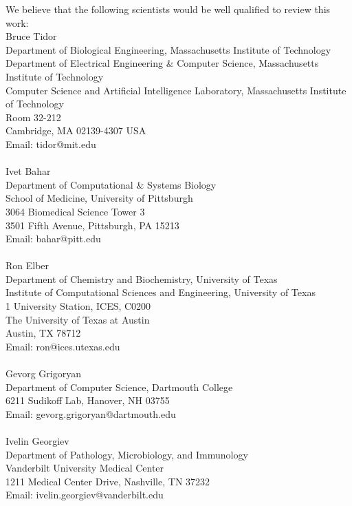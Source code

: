 \documentclass[11pt, oneside]{article}   	%
\begin{document}
\bigskip
We believe that the following scientists would be well qualified to review this work:
\\

\hspace{-0.285in} Bruce Tidor \\Department of Biological Engineering, Massachusetts Institute of Technology \\Department of Electrical Engineering \& Computer Science, Massachusetts Institute of Technology \\Computer Science and Artificial Intelligence Laboratory, Massachusetts Institute of Technology \\Room 32-212 \\Cambridge, MA 02139-4307 USA \\Email: tidor@mit.edu \\
 \\\hspace{-0.285in} Ivet Bahar \\Department of Computational \& Systems Biology \\School of Medicine, University of Pittsburgh \\3064 Biomedical Science Tower 3 \\3501 Fifth Avenue, Pittsburgh, PA 15213 \\Email: bahar@pitt.edu \\
  \\\hspace{-0.285in} Ron Elber \\Department of Chemistry and Biochemistry, University of Texas \\Institute of Computational Sciences and Engineering, University of Texas \\1 University Station, ICES, C0200 \\The University of Texas at Austin \\Austin, TX 78712 \\Email: ron@ices.utexas.edu \\
     \\\hspace{-0.285in} Gevorg Grigoryan \\Department of Computer Science, Dartmouth College \\6211 Sudikoff Lab, Hanover, NH 03755 \\Email: gevorg.grigoryan@dartmouth.edu \\
     \\\hspace{-0.285in} Ivelin Georgiev \\ Department of Pathology, Microbiology, and Immunology \\Vanderbilt University Medical Center \\ 1211 Medical Center Drive, Nashville, TN 37232  \\Email:  ivelin.georgiev@vanderbilt.edu \\
\end{document}
